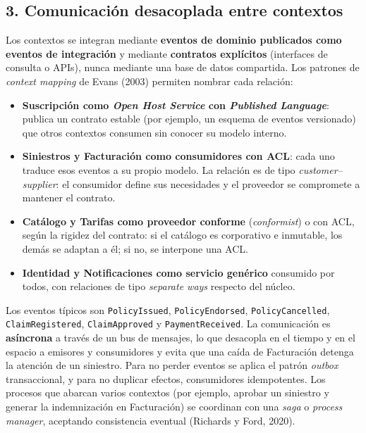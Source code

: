 \documentclass[11pt,a4paper]{article}
\begin{document}
\subsection*{3. Comunicación desacoplada entre contextos}

Los contextos se integran mediante \textbf{eventos de dominio publicados como eventos de
integración} y mediante \textbf{contratos explícitos} (interfaces de consulta o APIs),
nunca mediante una base de datos compartida. Los patrones de \emph{context mapping} de
Evans (2003) permiten nombrar cada relación:

\begin{itemize}[leftmargin=1.4em]
\item \textbf{Suscripción como \emph{Open Host Service} con \emph{Published Language}}: publica
un contrato estable (por ejemplo, un esquema de eventos versionado) que otros contextos
consumen sin conocer su modelo interno.
\item \textbf{Siniestros y Facturación como consumidores con ACL}: cada uno traduce esos
eventos a su propio modelo. La relación es de tipo \emph{customer--supplier}: el
consumidor define sus necesidades y el proveedor se compromete a mantener el contrato.
\item \textbf{Catálogo y Tarifas como proveedor conforme} (\emph{conformist}) o con ACL,
según la rigidez del contrato: si el catálogo es corporativo e inmutable, los demás se
adaptan a él; si no, se interpone una ACL.
\item \textbf{Identidad y Notificaciones como servicio genérico} consumido por todos,
con relaciones de tipo \emph{separate ways} respecto del núcleo.
\end{itemize}

\begin{sloppypar}
Los eventos típicos son \texttt{PolicyIssued}, \texttt{PolicyEndorsed},
\texttt{PolicyCancelled}, \texttt{ClaimRegistered}, \texttt{ClaimApproved} y
\texttt{PaymentReceived}. La comunicación es \textbf{asíncrona} a través de un bus de
mensajes, lo que desacopla en el tiempo y en el espacio a emisores y consumidores y evita
que una caída de Facturación detenga la atención de un siniestro. Para no perder eventos
se aplica el patrón \emph{outbox} transaccional, y para no duplicar efectos, consumidores
idempotentes. Los procesos que abarcan varios contextos (por ejemplo, aprobar un siniestro
y generar la indemnización en Facturación) se coordinan con una \emph{saga} o
\emph{process manager}, aceptando consistencia eventual (Richards y Ford, 2020).
\end{sloppypar}
\end{document}
